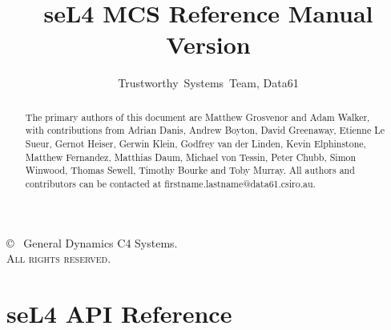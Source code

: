 \documentclass[a4paper,11pt,twoside]{report}
\date{}
\date{}
\newcommand{\version}{}
\begin{document}
  \title{seL4 MCS Reference Manual\\Version \version}

  \author{Trustworthy~Systems~Team, Data61}
  \date{\commitdate}

  \maketitle

  \thispagestyle{empty}

  \vfill

  \copyright~{\commityear} General Dynamics C4 Systems.\\

  \textsc{All rights reserved}.

  \thispagestyle{empty}
  \vfill
  \renewcommand{\abstractname}{Acknowledgements}
  \begin{abstract}
The primary authors of this document are Matthew Grosvenor and Adam Walker,
with contributions from Adrian Danis, Andrew Boyton, David Greenaway, Etienne
Le Sueur, Gernot Heiser, Gerwin Klein, Godfrey van der Linden, Kevin
Elphinstone, Matthew Fernandez, Matthias Daum, Michael von Tessin, Peter Chubb,
Simon Winwood, Thomas Sewell, Timothy Bourke and Toby Murray. All authors 
and contributors can be contacted at firstname.lastname@data61.csiro.au.
  \end{abstract}
  \thispagestyle{empty}

  \cleardoublepage
  \setcounter{page}{1}
  \tableofcontents
  \listoftables
  \listoffigures

  \cleardoublepage
  \setcounter{page}{1}

  

  
  
  
  
  
  
  
  

  \chapter{seL4 API Reference}
  \label{sec:api_reference}
  

  \cleardoublepage
  
  
\end{document}
